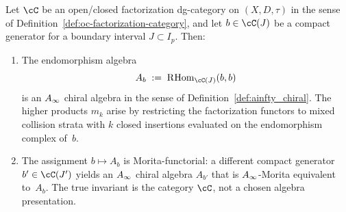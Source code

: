 \begin{theorem}
\label{thm:boundary-algebra-from-vacuum}
Let\/ $\cC$ be an open/closed factorization dg-category on
$(X, D, \tau)$ in the sense of
Definition~\textup{\ref{def:oc-factorization-category}}, and let\/
$b \in \cC(J)$ be a compact generator\/ for a boundary interval
$J \subset I_p$. Then:
\begin{enumerate}[label=\textup{(\alph*)}]
\item The endomorphism algebra
 \[
 A_b \;:=\; \RHom_{\cC(J)}(b, b)
 \]
 is an\/ $A_\infty$ chiral algebra in the sense of
 Definition~\textup{\ref{def:ainfty_chiral}}. The higher
 products\/ $m_k$ arise by restricting the factorization functors
 to mixed collision strata with\/ $k$ closed insertions
 evaluated on the endomorphism complex of\/~$b$.

\item The assignment\/ $b \mapsto A_b$ is Morita-functorial: a
 different compact generator\/ $b' \in \cC(J')$ yields an\/
 $A_\infty$ chiral algebra\/ $A_{b'}$ that is\/ $A_\infty$-Morita
 equivalent to\/~$A_b$. The true invariant is the category\/
 $\cC$, not a chosen algebra presentation.
\end{enumerate}
\end{theorem}

